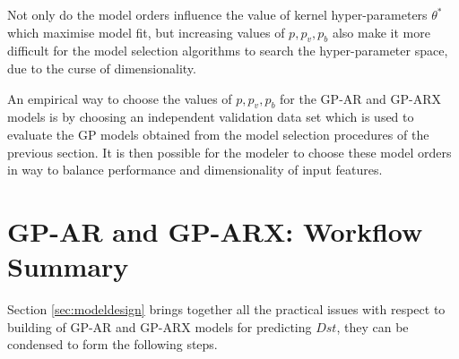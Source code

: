 \documentclass{article}
\begin{document}
Not only do the model orders influence the value of kernel hyper-parameters $\theta^*$ which maximise model fit, but increasing values of $p, p_v, p_b$ also make it more difficult for the model selection algorithms to search the hyper-parameter space, due to the curse of dimensionality.

An empirical way to choose the values of $p, p_v, p_b$ for the GP-AR and GP-ARX models is by choosing an independent validation data set which is used to evaluate the GP models obtained from the model selection procedures of the previous section. It is then possible for the modeler to choose these model orders in way to balance performance and dimensionality of input features.

\section{GP-AR and GP-ARX: Workflow Summary}\label{sec:workflow}

Section \ref{sec:modeldesign} brings together all the practical issues with respect to building of GP-AR and GP-ARX models for predicting $Dst$, they can be condensed to form the following steps.
\end{document}
